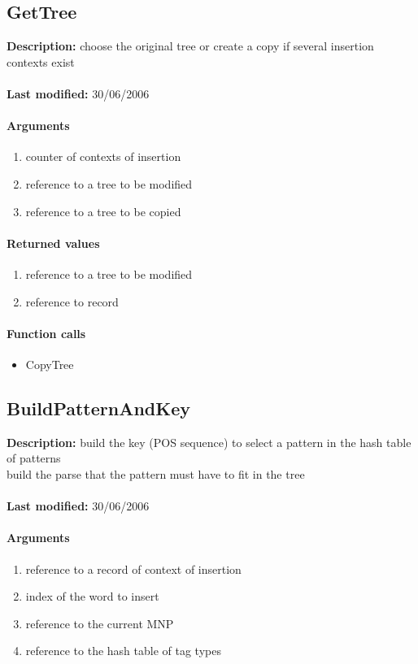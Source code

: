 \subsection{GetTree}
\textbf{Description:} choose the original tree or create a copy if several insertion contexts exist\\
\\\textbf{Last modified:} 30/06/2006

\paragraph{Arguments}
\begin{enumerate}
\item counter of contexts of insertion
\item reference to a tree to be modified
\item reference to a tree to be copied
\end{enumerate}

\paragraph{Returned values}
\begin{enumerate}
\item reference to a tree to be modified
\item reference to record
\end{enumerate}

\paragraph{Function calls}
\begin{itemize}
\item CopyTree
\end{itemize}

\subsection{BuildPatternAndKey}
\textbf{Description:} build the key (POS sequence) to select a pattern in the hash table of patterns\\
build the parse that the pattern must have to fit in the tree\\
\\\textbf{Last modified:} 30/06/2006

\paragraph{Arguments}
\begin{enumerate}
\item reference to a record of context of insertion
\item index of the word to insert
\item reference to the current MNP
\item reference to the hash table of tag types
\end{enumerate}

